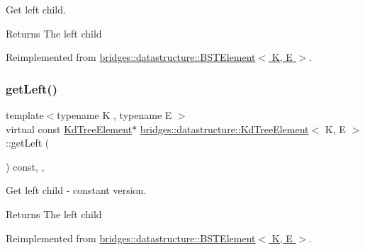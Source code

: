 Get left child. 

\begin{DoxyReturn}{Returns}
The left child 
\end{DoxyReturn}


Reimplemented from \hyperlink{classbridges_1_1datastructure_1_1_b_s_t_element_af863c624691c11db26ae3b6d723d1f5c}{bridges\+::datastructure\+::\+B\+S\+T\+Element$<$ K, E $>$}.

\mbox{\label{classbridges_1_1datastructure_1_1_kd_tree_element_a653597918fbc6e31b84fcf8dbdf67122}} 
\subsubsection{\texorpdfstring{get\+Left()}{getLeft()}\hspace{0.1cm}{\footnotesize\ttfamily [2/2]}}
{\footnotesize\ttfamily template$<$typename K , typename E $>$ \\
virtual const \hyperlink{classbridges_1_1datastructure_1_1_kd_tree_element}{Kd\+Tree\+Element}$\ast$ \hyperlink{classbridges_1_1datastructure_1_1_kd_tree_element}{bridges\+::datastructure\+::\+Kd\+Tree\+Element}$<$ K, E $>$\+::get\+Left (\begin{DoxyParamCaption}{ }\end{DoxyParamCaption}) const\hspace{0.3cm}{\ttfamily [inline]}, {\ttfamily [override]}, {\ttfamily [virtual]}}



Get left child -\/ constant version. 

\begin{DoxyReturn}{Returns}
The left child 
\end{DoxyReturn}


Reimplemented from \hyperlink{classbridges_1_1datastructure_1_1_b_s_t_element_abac324ef0b480420bd82ecfe4501d60d}{bridges\+::datastructure\+::\+B\+S\+T\+Element$<$ K, E $>$}.

\mbox{\label{classbridges_1_1datastructure_1_1_kd_tree_element_a6b284e9ba808f70e163977ee1e35ba86}} 
